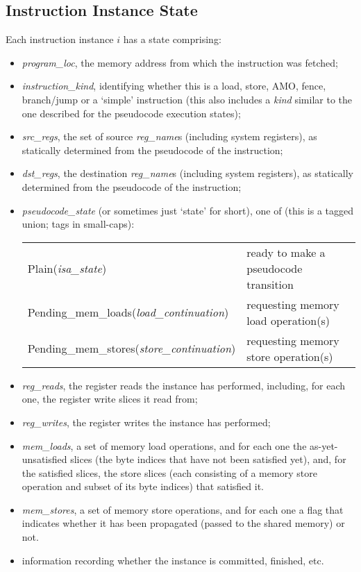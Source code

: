 \subsection{Instruction Instance State}\label{sec:omm:inst_state}
Each instruction instance $i$ has a state comprising:
\begin{itemize}
\item {\it program\_loc}, the memory address from which the instruction was fetched;
\item {\it instruction\_kind}, identifying whether this is a load, store, AMO, fence, branch/jump or a `simple' instruction (this also includes a {\it kind} similar to the one described for the pseudocode execution states);
\item {\it src\_regs}, the set of source {\it reg\_name}s (including system registers), as statically determined from the pseudocode of the instruction;
\item {\it dst\_regs}, the destination {\it reg\_name}s (including system registers), as statically determined from the pseudocode of the instruction;
\item {\it pseudocode\_state} (or sometimes just `state' for short), one of (this is a tagged union; tags in small-caps):
  \begin{center}
  \begin{tabular}{l@{ \quad-\quad }l}
  {\sc Plain}({\it isa\_state})
    & ready to make a pseudocode transition \\
  {\sc Pending\_mem\_loads}({\it load\_continuation})
    & requesting memory load operation(s) \\
  {\sc Pending\_mem\_stores}({\it store\_continuation})
    & requesting memory store operation(s) \\
  \end{tabular}
  \end{center}

\item {\it reg\_reads}, the register reads the instance has performed, including, for each one, the register write slices it read from;
\item {\it reg\_writes}, the register writes the instance has performed;
\item {\it mem\_loads}, a set of memory load operations, and for each one
  the as-yet-unsatisfied slices (the byte indices that have not been
  satisfied yet), and, for the satisfied slices, the store slices
  (each consisting of a memory store operation and subset of its byte indices) that satisfied it.
\item {\it mem\_stores}, a set of memory store operations, and for each one a flag that indicates whether it has been propagated (passed to the shared memory) or not.
\item information recording whether the instance is committed, finished, etc.
\end{itemize}

